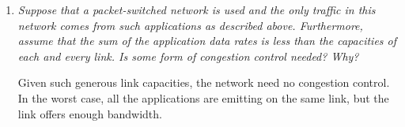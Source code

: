 \documentclass[11pt,a4paper]{article}
\begin{document}
\begin{enumerate}
\begin{enumerate}
    \item \emph{Suppose that a packet-switched network is used and the
    only traffic in this network comes from such applications as
    described above. Furthermore, assume that the sum of the
    application data rates is less than the capacities of each and
    every link. Is some form of congestion control needed? Why?}

    Given such generous link capacities, the network need no congestion
    control. In the worst case, all the applications are emitting on
    the same link, but the link offers enough bandwidth.

  \end{enumerate}

\end{enumerate}
\end{document}
